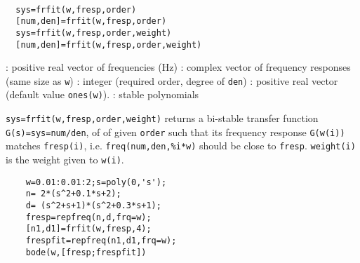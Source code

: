 
\begin{mandesc}
   \\ %
\end{mandesc}
\begin{calling_sequence}
\begin{verbatim}
  sys=frfit(w,fresp,order)  
  [num,den]=frfit(w,fresp,order)  
  sys=frfit(w,fresp,order,weight)  
  [num,den]=frfit(w,fresp,order,weight)  
\end{verbatim}
\end{calling_sequence}
\begin{parameters}
  \begin{varlist}
    : positive real vector of frequencies (Hz)
    : complex vector of frequency responses (same size as \verb!w!)
    : integer (required order, degree of \verb!den!)
    : positive real vector (default value \verb!ones(w)!).
    : stable polynomials
  \end{varlist}
\end{parameters}
\begin{mandescription}
  \verb!sys=frfit(w,fresp,order,weight)! returns a bi-stable transfer function
  \verb!G(s)=sys=num/den!, of of given \verb!order! such that 
  its frequency response \verb!G(w(i))! matches \verb!fresp(i)!, i.e.
  \verb!freq(num,den,%i*w)! should be close to \verb!fresp!.
  \verb!weight(i)! is the weight given to \verb!w(i)!.
\end{mandescription}
\begin{examples}
  \begin{Verbatim}
    w=0.01:0.01:2;s=poly(0,'s');
    n= 2*(s^2+0.1*s+2);
    d= (s^2+s+1)*(s^2+0.3*s+1);
    fresp=repfreq(n,d,frq=w);
    [n1,d1]=frfit(w,fresp,4);
    frespfit=repfreq(n1,d1,frq=w);
    bode(w,[fresp;frespfit])
  \end{Verbatim}
\end{examples}
\begin{manseealso}
         
\end{manseealso}
